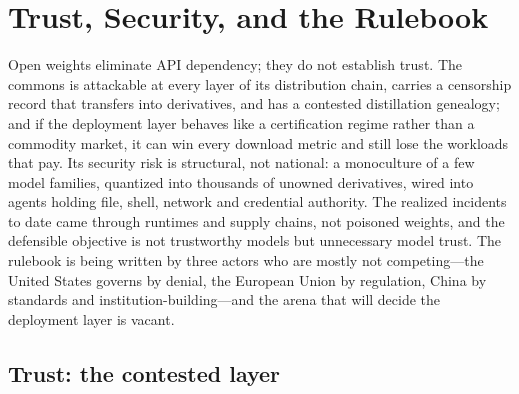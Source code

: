 \chapter{Trust, Security, and the Rulebook}
\label{c:trust}

\begin{glance}
Open weights eliminate API dependency; they do not establish trust. The commons is attackable at every layer of its distribution chain, carries a censorship record that transfers into derivatives, and has a contested distillation genealogy; and if the deployment layer behaves like a certification regime rather than a commodity market, it can win every download metric and still lose the workloads that pay. Its security risk is structural, not national: a monoculture of a few model families, quantized into thousands of unowned derivatives, wired into agents holding file, shell, network and credential authority. The realized incidents to date came through runtimes and supply chains, not poisoned weights, and the defensible objective is not trustworthy models but unnecessary model trust. The rulebook is being written by three actors who are mostly not competing---the United States governs by denial, the European Union by regulation, China by standards and institution-building---and the arena that will decide the deployment layer is vacant.
\end{glance}

\section{Trust: the contested layer}


